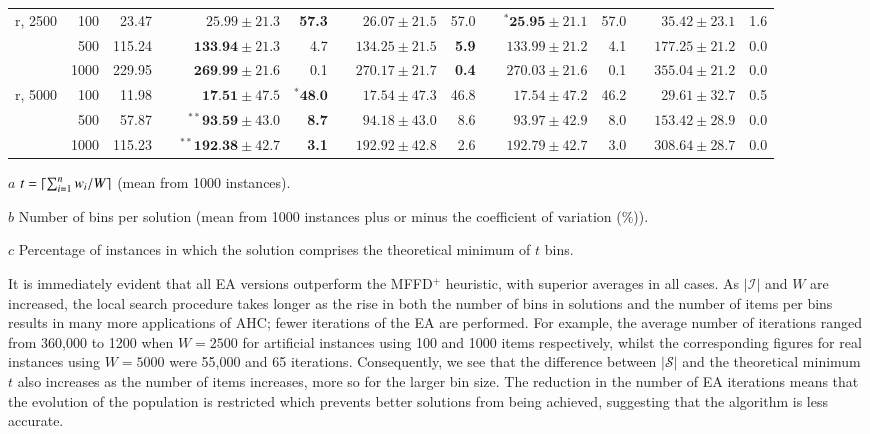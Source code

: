 \documentclass[a4paper,11pt,authoryear]{elsarticle}
\begin{document}
\begin{table}[h]
\begin{threeparttable}
{\begin{tabular}{crrcrrcrrcrrcrr}
	\midrule
	\midrule
	r, 2500 & 100 & 23.47 && $25.99 \pm 21.3$ & \textbf{57.3} && $26.07 \pm 21.5$ & 57.0 && $^{*}\textbf{25.95} \pm 21.1$ & 57.0 && $35.42 \pm 23.1$ & 1.6 \\
	& 500 & 115.24 && $\textbf{133.94} \pm 21.3$ & 4.7 && $134.25 \pm 21.5$ & \textbf{5.9} && $133.99 \pm 21.2$ & 4.1 && $177.25 \pm 21.2$ & 0.0 \\
	& 1000 & 229.95 && $\textbf{269.99} \pm 21.6$ & 0.1 && $270.17 \pm 21.7$ & \textbf{0.4} && $270.03 \pm 21.6$ & 0.1 && $355.04 \pm 21.2$ & 0.0 \\
	\midrule
	r, 5000 & 100 & 11.98 && $\textbf{17.51} \pm 47.5$ & $^{*}\textbf{48.0}$ && $17.54 \pm 47.3$ & 46.8 && $17.54 \pm 47.2$ & 46.2 && $29.61 \pm 32.7$ & 0.5 \\
	& 500 & 57.87 && $^{**}\textbf{93.59} \pm 43.0$ & \textbf{8.7} && $94.18 \pm 43.0$ & 8.6 && $93.97 \pm 42.9$ & 8.0 && $153.42 \pm 28.9$ & 0.0 \\
	& 1000 & 115.23 && $^{**}\textbf{192.38} \pm 42.7$ & \textbf{3.1} && $192.92 \pm 42.8$ & 2.6 && $192.79 \pm 42.7$ & 3.0 && $308.64 \pm 28.7$ & 0.0 \\
	\bottomrule
\end{tabular}}	
\vspace{0.2cm} %
\begin{tablenotes}
	\tiny
	\item[$a$] $t = \lceil\sum_{i=1}^{n} w_i / W\rceil$ (mean from 1000 instances).
	\item[$b$] Number of bins per solution (mean from 1000 instances plus or minus the coefficient of variation (\%)).
	\item[$c$] Percentage of instances in which the solution comprises the theoretical minimum of $t$ bins.
\end{tablenotes}
\end{threeparttable}
\label{table:ea}
\end{table}

\noindent It is immediately evident that all EA versions outperform the MFFD$^+$ heuristic, with superior averages in all cases. As $|\mathcal{I}|$ and $W$ are increased, the local search procedure takes longer as the rise in both the number of bins in solutions and the number of items per bins results in many more applications of AHC; fewer iterations of the EA are performed. For example, the average number of iterations ranged from 360,000 to 1200 when $W=2500$ for artificial instances using 100 and 1000 items respectively, whilst the corresponding figures for real instances using $W=5000$ were 55,000 and 65 iterations. Consequently, we see that the difference between $|\mathcal{S}|$ and the theoretical minimum $t$ also increases as the number of items increases, more so for the larger bin size. The reduction in the number of EA iterations means that the evolution of the population is restricted which prevents better solutions from being achieved, suggesting that the algorithm is less accurate.
\end{document}

